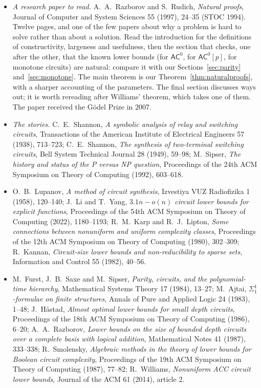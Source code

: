 \begin{itemize}
\item \emph{A research paper to read.} A.~A.~Razborov and S.~Rudich, \emph{Natural proofs}, Journal of Computer and System Sciences 55 (1997), 24--35 (STOC 1994). Twelve pages, and one of the few papers about why a problem is hard to solve rather than about a solution. Read the introduction for the definitions of constructivity, largeness and usefulness, then the section that checks, one after the other, that the known lower bounds (for $\mathsf{AC}^0$, for $\mathsf{AC}^0[p]$, for monotone circuits) are natural: compare it with our Sections~\ref{sec:parity} and~\ref{sec:monotone}. The main theorem is our Theorem~\ref{thm:naturalproofs}, with a sharper accounting of the parameters. The final section discusses ways out; it is worth rereading after Williams' theorem, which takes one of them. The paper received the G\"odel Prize in 2007.
\item \emph{The stories.} C.~E.~Shannon, \emph{A symbolic analysis of relay and switching circuits}, Transactions of the American Institute of Electrical Engineers 57 (1938), 713--723; C.~E.~Shannon, \emph{The synthesis of two-terminal switching circuits}, Bell System Technical Journal 28 (1949), 59--98; M.~Sipser, \emph{The history and status of the P versus NP question}, Proceedings of the 24th ACM Symposium on Theory of Computing (1992), 603--618.
\item O.~B.~Lupanov, \emph{A method of circuit synthesis}, Izvestiya VUZ Radiofizika 1 (1958), 120--140; J.~Li and T.~Yang, \emph{$3.1n-o(n)$ circuit lower bounds for explicit functions}, Proceedings of the 54th ACM Symposium on Theory of Computing (2022), 1180--1193; R.~M.~Karp and R.~J.~Lipton, \emph{Some connections between nonuniform and uniform complexity classes}, Proceedings of the 12th ACM Symposium on Theory of Computing (1980), 302--309; R.~Kannan, \emph{Circuit-size lower bounds and non-reducibility to sparse sets}, Information and Control 55 (1982), 40--56.
\item M.~Furst, J.~B.~Saxe and M.~Sipser, \emph{Parity, circuits, and the polynomial-time hierarchy}, Mathematical Systems Theory 17 (1984), 13--27; M.~Ajtai, \emph{$\Sigma^1_1$-formulae on finite structures}, Annals of Pure and Applied Logic 24 (1983), 1--48; J.~Håstad, \emph{Almost optimal lower bounds for small depth circuits}, Proceedings of the 18th ACM Symposium on Theory of Computing (1986), 6--20; A.~A.~Razborov, \emph{Lower bounds on the size of bounded depth circuits over a complete basis with logical addition}, Mathematical Notes 41 (1987), 333--338; R.~Smolensky, \emph{Algebraic methods in the theory of lower bounds for Boolean circuit complexity}, Proceedings of the 19th ACM Symposium on Theory of Computing (1987), 77--82; R.~Williams, \emph{Nonuniform ACC circuit lower bounds}, Journal of the ACM 61 (2014), article 2.

\end{itemize}
